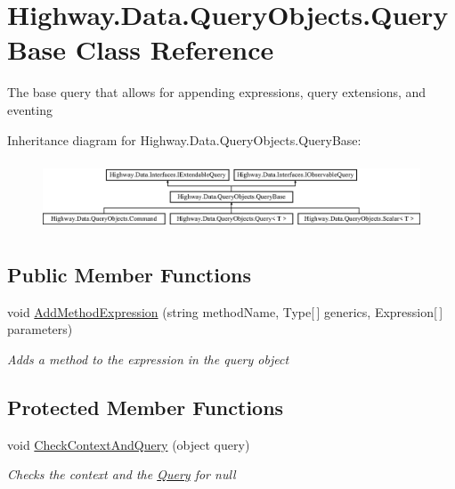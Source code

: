 \hypertarget{class_highway_1_1_data_1_1_query_objects_1_1_query_base}{\section{Highway.\-Data.\-Query\-Objects.\-Query\-Base Class Reference}
\label{class_highway_1_1_data_1_1_query_objects_1_1_query_base}
}


The base query that allows for appending expressions, query extensions, and eventing  


Inheritance diagram for Highway.\-Data.\-Query\-Objects.\-Query\-Base\-:\begin{figure}[H]
\begin{center}
\leavevmode
\includegraphics[height=2.089552cm]{class_highway_1_1_data_1_1_query_objects_1_1_query_base}
\end{center}
\end{figure}
\subsection*{Public Member Functions}
\begin{DoxyCompactItemize}
\item 
void \hyperlink{class_highway_1_1_data_1_1_query_objects_1_1_query_base_ace7c9da4af343caab20f5fdd38b47557}{Add\-Method\-Expression} (string method\-Name, Type\mbox{[}$\,$\mbox{]} generics, Expression\mbox{[}$\,$\mbox{]} parameters)
\begin{DoxyCompactList}\small\item\em Adds a method to the expression in the query object \end{DoxyCompactList}\end{DoxyCompactItemize}
\subsection*{Protected Member Functions}
\begin{DoxyCompactItemize}
\item 
void \hyperlink{class_highway_1_1_data_1_1_query_objects_1_1_query_base_a2abee86dc5bd2bfa2463c343e7574dfb}{Check\-Context\-And\-Query} (object query)
\begin{DoxyCompactList}\small\item\em Checks the context and the \hyperlink{class_highway_1_1_data_1_1_query_objects_1_1_query-g}{Query} for null \end{DoxyCompactList}\end{DoxyCompactItemize}
